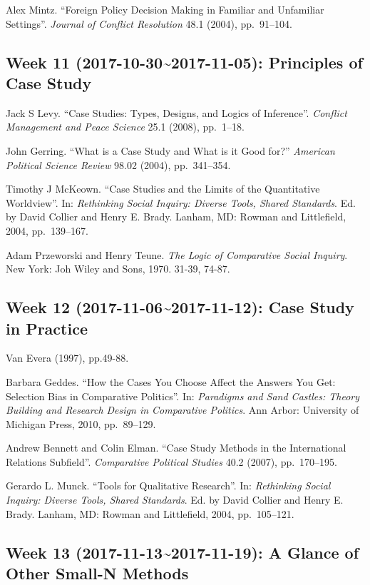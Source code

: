 \documentclass[11pt,]{article}
\theoremstyle{definition}
\theoremstyle{definition}
\theoremstyle{remark}
\begin{document}
Alex Mintz. ``Foreign Policy Decision Making in Familiar and Unfamiliar
Settings''. \emph{Journal of Conflict Resolution} 48.1 (2004),
pp.~91--104.

\subsection{Week 11 (2017-10-30\textasciitilde{}2017-11-05): Principles
of Case
Study}\label{week-11-2017-10-302017-11-05-principles-of-case-study}

Jack S Levy. ``Case Studies: Types, Designs, and Logics of Inference''.
\emph{Conflict Management and Peace Science} 25.1 (2008), pp.~1--18.

John Gerring. ``What is a Case Study and What is it Good for?''
\emph{American Political Science Review} 98.02 (2004), pp.~341--354.

Timothy J McKeown. ``Case Studies and the Limits of the Quantitative
Worldview''. In:
\emph{Rethinking Social Inquiry: Diverse Tools, Shared Standards}. Ed.
by David Collier and Henry E. Brady. Lanham, MD: Rowman and Littlefield,
2004, pp.~139--167.

Adam Przeworski and Henry Teune.
\emph{The Logic of Comparative Social Inquiry}. New York: Joh Wiley and
Sons, 1970. 31-39, 74-87.

\subsection{Week 12 (2017-11-06\textasciitilde{}2017-11-12): Case Study
in Practice}\label{week-12-2017-11-062017-11-12-case-study-in-practice}

Van Evera (1997), pp.49-88.

Barbara Geddes. ``How the Cases You Choose Affect the Answers You Get:
Selection Bias in Comparative Politics''. In:
\emph{Paradigms and Sand Castles: Theory Building and Research Design in Comparative Politics}.
Ann Arbor: University of Michigan Press, 2010, pp.~89--129.

Andrew Bennett and Colin Elman. ``Case Study Methods in the
International Relations Subfield''. \emph{Comparative Political Studies}
40.2 (2007), pp.~170--195.

Gerardo L. Munck. ``Tools for Qualitative Research''. In:
\emph{Rethinking Social Inquiry: Diverse Tools, Shared Standards}. Ed.
by David Collier and Henry E. Brady. Lanham, MD: Rowman and Littlefield,
2004, pp.~105--121.

\subsection{Week 13 (2017-11-13\textasciitilde{}2017-11-19): A Glance of
Other Small-N
Methods}\label{week-13-2017-11-132017-11-19-a-glance-of-other-small-n-methods}
\end{document}
